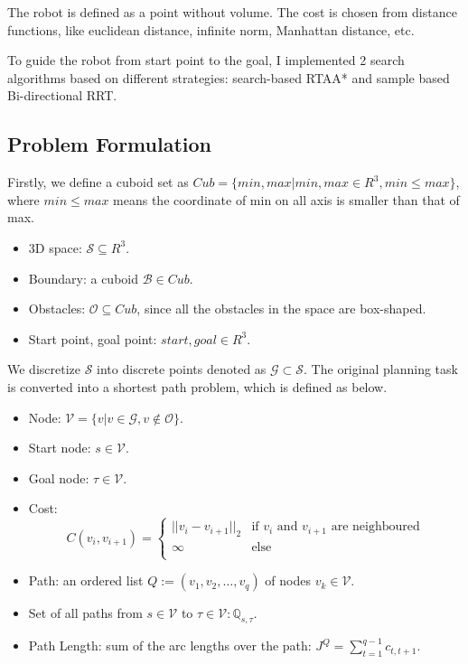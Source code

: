\documentclass{article} %
\begin{document}
The robot is defined as a point without volume. The cost is chosen from distance functions, like euclidean distance, infinite norm, Manhattan distance, etc.

To guide the robot from start point to the goal, I implemented 2 search algorithms based on different strategies: search-based RTAA* and sample based Bi-directional RRT.

\subsection{Problem Formulation}
Firstly, we define a cuboid set as $Cub = \{ min, max | min, max \in R^3, min \le max\}$, where $min \le max$ means the coordinate of min on all axis is smaller than that of max.
\begin{itemize}
    \item 3D space: $\mathcal{S} \subseteq R^3$.
    \item Boundary: a cuboid $\mathcal{B} \in Cub$.
    \item Obstacles: $\mathcal{O} \subseteq Cub$, since all the obstacles in the space are box-shaped.
    \item Start point, goal point: $start, goal \in R^3$.
\end{itemize}

We discretize $\mathcal{S}$ into discrete points denoted as $\mathcal{G} \subset \mathcal{S}$. The original planning task is converted into a shortest path problem, which is defined as below.

\begin{itemize}
    \item Node: $\mathcal{V} = \{v | v \in \mathcal{G}, v \notin \mathcal{O}\}$.
    \item Start node: $s \in \mathcal{V}$.
    \item Goal node: $\tau \in \mathcal{V}$.
    \item Cost:	$$C(v_i, v_{i+1})=
    \begin{cases}
    ||v_i - v_{i+1}||_2 & \text{if $v_i$ and $v_{i+1}$ are neighboured} \\
    \infty & \text{else} \\
    \end{cases}$$
    \item Path: an ordered list $Q :=\left(v_{1}, v_{2}, \ldots, v_{q}\right)$ of nodes $v_{k} \in \mathcal{V}$.
    \item Set of all paths from $s \in \mathcal{V}$ to $\tau \in \mathcal{V} : \mathbb{Q}_{s, \tau}$.
    \item Path Length: sum of the arc lengths over the path: $J^{Q}=\sum_{t=1}^{q-1} c_{t, t+1}$.
\end{itemize}
\end{document}

